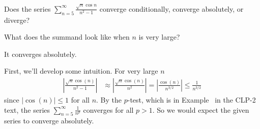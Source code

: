 \begin{Mquestion}[2016Q5]
Does the series $\displaystyle \sum_{n=5}^\infty \frac{\sqrt{n}\cos n}{n^2-1}$
converge conditionally, converge absolutely, or diverge?
\end{Mquestion}

\begin{hint}
What does the summand look like when $n$ is very large?
\end{hint}

\begin{answer}
It converges absolutely.
\end{answer}

\begin{solution}
First, we'll develop some intuition. For very large $n$
\begin{align*}
\left|\frac{\sqrt{n}\cos(n)}{n^2-1}\right|
&\approx \left|\frac{\sqrt{n}\cos(n)}{n^2}\right|
= \left|\frac{\cos(n)}{n^{3/2}}\right|
\le \frac{1}{n^{3/2}}
\end{align*}
since $\left|\cos(n)\right| \leq 1$ for all $n$. By the $p$-test, 
which is in Example~ in the CLP-2 text, the series
$\displaystyle \sum_{n=5}^\infty \frac{1}{n^p}$ converges for all $p>1$. So we would
expect the given series to converge absolutely.


\end{solution}
